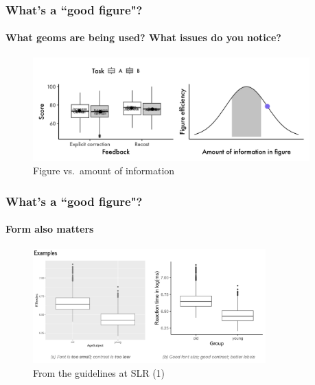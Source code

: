 \documentclass[xcolor=dvipsnames, handout, onlymath, 10pt, aspectratio=169]{beamer}
\begin{document}
\begin{frame}
	\frametitle{What's a ``good figure"?}
	\framesubtitle{What geoms are being used? What issues do you notice?}

	\begin{figure}
		\begin{center}
			\includegraphics[width=0.95\textwidth]{ex5.jpeg}
		\end{center}
		\caption{Figure vs.\ amount of information}\label{fig:f5}
	\end{figure}

\end{frame}

%


\begin{frame}
	\frametitle{What's a ``good figure"?}
	\framesubtitle{Form also matters}

	\begin{figure}
		\begin{center}
			\includegraphics[width=0.8\textwidth]{slr_figures_1.png}
		\end{center}
		\caption{From the guidelines at SLR (1)}\label{fig:slr1}
	\end{figure}

\end{frame}
\end{document}
